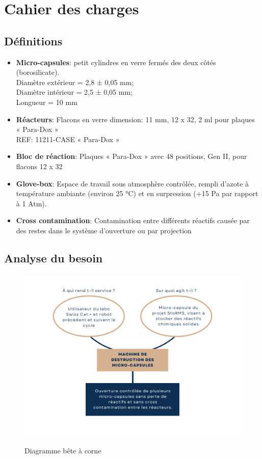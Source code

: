 \section{Cahier des charges}

\subsection{Définitions}

\begin{itemize}[label=\textbullet]
    \item \textbf{Micro-capsules}: petit cylindres en verre fermés des deux côtés (borosilicate). \\ 
    Diamètre extérieur = 2,8 ± 0,05 mm; \\
    Diamètre intérieur = 2,5 ± 0,05 mm; \\
    Longueur = 10 mm

    \item \textbf{Réacteurs}: Flacons en verre dimension: 11 mm, 12 x 32, 2 ml pour plaques « Para-Dox »\\
    REF: 11211-CASE  « Para-Dox »

    \item \textbf{Bloc de réaction}: Plaques « Para-Dox » avec 48 positions, Gen II, pour flacons 12 x 32
    
    \item \textbf{Glove-box}: Espace de travail sous atmosphère contrôlée, rempli d'azote à température 
    ambiante (environ 25 °C) et en surpression (+15 Pa par rapport à 1 Atm).
    \item \textbf{Cross contamination}: Contamination entre différents réactifs 
    causée par des restes dans le système d'ouverture ou par projection
\end{itemize}

\subsection{Analyse du besoin}

\begin{figure}[H]
    \centering
    \includegraphics[width=15cm]{Images/Illustrations/CDH/Bete a corne.png}
    \label{fig:beteacorne}
    \caption{Diagramme bête à corne}
\end{figure}

